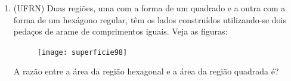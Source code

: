 \begin{enumerate}
  \item (UFRN) Duas regiões, uma com a forma de um quadrado e a outra com a forma de um hexágono regular, têm os lados construídos utilizando-se dois pedaços de arame de comprimentos iguais. Veja as figuras:

  \begin{figure}[H]
  \centering

  \texttt{[image: superficie98]}
  \end{figure}

  A razão entre a área da região hexagonal e a área da região quadrada é?
\end{enumerate}

\ifnum{}
\clearpage
\else
\notasfinais
\fi




\nocite{*}